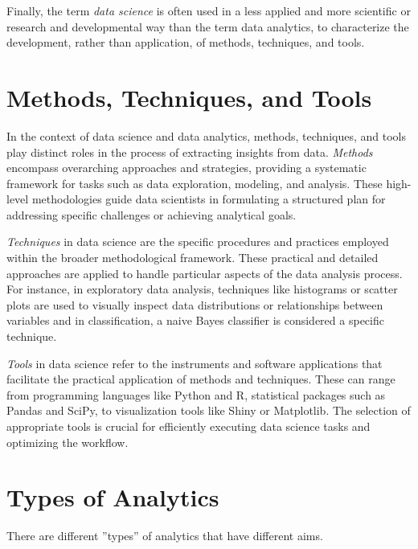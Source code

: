 Finally, the term \emph{data science} is often used in a less applied and more scientific or research and developmental way than the term data analytics, to characterize the development, rather than application, of methods, techniques, and tools.

\section{Methods, Techniques, and Tools}

In the context of data science and data analytics, methods, techniques, and tools play distinct roles in the process of extracting insights from data. \emph{Methods} encompass overarching approaches and strategies, providing a systematic framework for tasks such as data exploration, modeling, and analysis. These high-level methodologies guide data scientists in formulating a structured plan for addressing specific challenges or achieving analytical goals.

\emph{Techniques} in data science are the specific procedures and practices employed within the broader methodological framework. These practical and detailed approaches are applied to handle particular aspects of the data analysis process. For instance, in exploratory data analysis, techniques like histograms or scatter plots are used to visually inspect data distributions or relationships between variables and in classification, a naive Bayes classifier is considered a specific technique.

\emph{Tools} in data science refer to the instruments and software applications that facilitate the practical application of methods and techniques. These can range from programming languages like Python and R, statistical packages such as Pandas and SciPy, to visualization tools like Shiny or Matplotlib. The selection of appropriate tools is crucial for efficiently executing data science tasks and optimizing the workflow.

\section{Types of Analytics}

There are different ''types'' of analytics that have different aims. 

